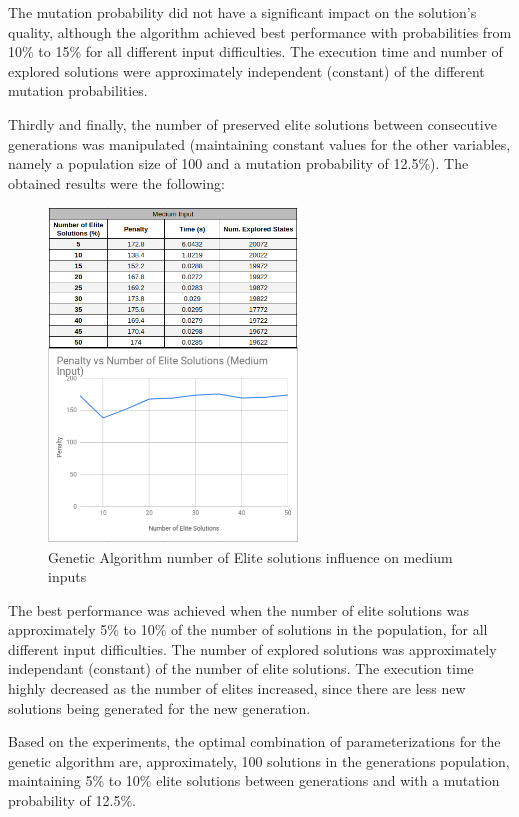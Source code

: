 \documentclass[conference]{IEEEtran}
\begin{document}
The mutation probability did not have a significant impact on the solution's quality, although the algorithm achieved best performance with probabilities from 10\% to 15\% for all different input difficulties. The execution time and number of explored solutions were approximately independent (constant) of the different mutation probabilities.

Thirdly and finally, the number of preserved elite solutions between consecutive generations was manipulated (maintaining constant values for the other variables, namely a population size of 100 and a mutation probability of 12.5\%). The obtained results were the following: 

\begin{figure}[H]
    \centerline{\includegraphics[width=250px]{elite_medium.png}}
    \caption{Genetic Algorithm number of Elite solutions influence on medium inputs}
\end{figure}

The best performance was achieved when the number of elite solutions was approximately 5\% to 10\% of the number of solutions in the population, for all different input difficulties. The number of explored solutions was approximately independant (constant) of the number of elite solutions. The execution time highly decreased as the number of elites increased, since there are less new solutions being generated for the new generation.

Based on the experiments, the optimal combination of parameterizations for the genetic algorithm are, approximately, 100 solutions in the generations population, maintaining 5\% to 10\% elite solutions between generations and with a mutation probability of 12.5\%.
\end{document}
